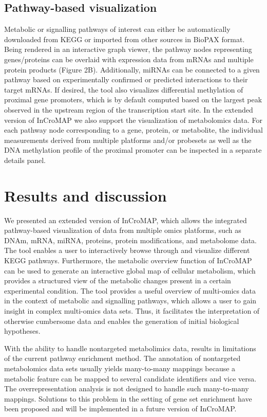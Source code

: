 \documentclass[final,5p,times,twocolumn]{elsarticle}
\begin{document}
\subsection{Pathway-based visualization}
Metabolic or signalling pathways of interest can either be automatically downloaded from KEGG or imported from other sources in BioPAX format. Being rendered in an interactive graph viewer, the pathway nodes representing genes/proteins can be overlaid with expression data from mRNAs and multiple protein products (Figure 2B). Additionally, miRNAs can be connected to a given pathway based on experimentally confirmed or predicted interactions to their target mRNAs. If desired, the tool also visualizes differential methylation of proximal gene promoters, which is by default computed based on the largest peak observed in the upstream region of the transcription start site. In the extended version of InCroMAP we also support the visualization of metabolomics data. For each pathway node corresponding to a gene, protein, or metabolite, the individual measurements derived from multiple platforms and/or probesets as well as the DNA methylation profile of the proximal promoter can be inspected in a separate details panel. 

\section{Results and discussion}
We presented an extended version of InCroMAP, which allows the integrated pathway-based visualization of data from multiple omics platforms, such as DNAm, mRNA, miRNA, proteins, protein modifications, and metabolome data. The tool enables a user to interactively browse through and visualize different KEGG pathways. Furthermore, the metabolic overview function of InCroMAP can be used to generate an interactive global map of cellular metabolism, which provides a structured view of the metabolic changes present in a certain experimental condition. The tool provides a useful overview of multi-omics data in the context of metabolic and signalling pathways, which allows a user to gain insight in complex multi-omics data sets. Thus, it facilitates the interpretation of otherwise cumbersome data and enables the generation of initial biological hypotheses. 

With the ability to handle nontargeted metabolimics data, results in limitations of the current pathway enrichment method. The annotation of nontargeted metabolomics data sets usually yields many-to-many mappings because a metabolic feature can be mapped to several candidate identifiers and vice versa. The overrepresentation analysis is not designed to handle such many-to-many mappings. Solutions to this problem in the setting of gene set enrichment have been proposed \cite{Kankainen2011} and will be implemented in a future version of InCroMAP. 
\end{document}
